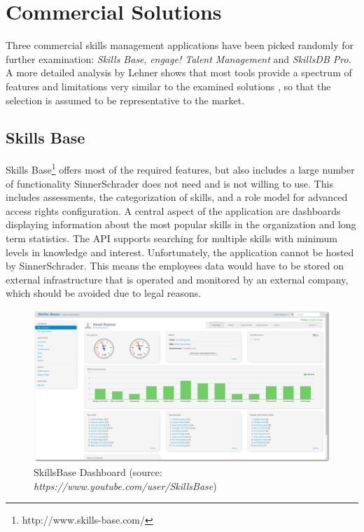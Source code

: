 \section{Commercial Solutions}
\label{commercial}
Three commercial skills management applications have been picked randomly for further examination: \textit{Skills Base}, \textit{engage! Talent Management} and \textit{SkillsDB Pro}.
A more detailed analysis by Lehner shows that most tools provide a spectrum of features and limitations very similar to the examined solutions \cite{Marktanalyse}, so that the selection is assumed to be representative to the market.

\subsection{Skills Base}
Skills Base\footnote{http://www.skills-base.com/} offers most of the required features, but also includes a large number of functionality SinnerSchrader does not need and is not willing to use. This includes assessments, the categorization of skills, and a role model for advanced access rights configuration.
A central aspect of the application are dashboards displaying information about the most popular skills in the organization and long term statistics. The API supports searching for multiple skills with minimum levels in knowledge and interest. Unfortunately, the application cannot be hosted by SinnerSchrader. This means the employees data would have to be stored on external infrastructure that is operated and monitored by an external company, which should be avoided due to legal reasons.
\begin{figure}[!htp]
    \centering
    \includegraphics[width=\textwidth]{images/skillsbase-dashboard.png}
    \caption[Screenshot: SkillsBase Dashboard]{SkillsBase Dashboard (source: \textit{https://www.youtube.com/user/SkillsBase})}
    \label{fig:skillsbase_dashboard}
\end{figure}

